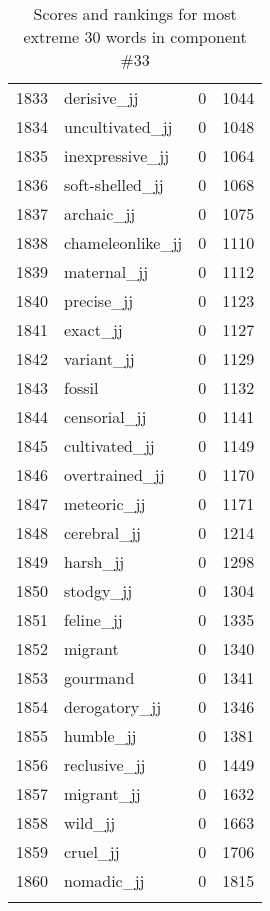 \begin{longtable}[!htbp]{| rlr@{.}l |}
    1833 & derisive\_jj & 0 & 1044 \\
    1834 & uncultivated\_jj & 0 & 1048 \\
    1835 & inexpressive\_jj & 0 & 1064 \\
    1836 & soft-shelled\_jj & 0 & 1068 \\
    1837 & archaic\_jj & 0 & 1075 \\
    1838 & chameleonlike\_jj & 0 & 1110 \\
    1839 & maternal\_jj & 0 & 1112 \\
    1840 & precise\_jj & 0 & 1123 \\
    1841 & exact\_jj & 0 & 1127 \\
    1842 & variant\_jj & 0 & 1129 \\
    1843 & fossil & 0 & 1132 \\
    1844 & censorial\_jj & 0 & 1141 \\
    1845 & cultivated\_jj & 0 & 1149 \\
    1846 & overtrained\_jj & 0 & 1170 \\
    1847 & meteoric\_jj & 0 & 1171 \\
    1848 & cerebral\_jj & 0 & 1214 \\
    1849 & harsh\_jj & 0 & 1298 \\
    1850 & stodgy\_jj & 0 & 1304 \\
    1851 & feline\_jj & 0 & 1335 \\
    1852 & migrant & 0 & 1340 \\
    1853 & gourmand & 0 & 1341 \\
    1854 & derogatory\_jj & 0 & 1346 \\
    1855 & humble\_jj & 0 & 1381 \\
    1856 & reclusive\_jj & 0 & 1449 \\
    1857 & migrant\_jj & 0 & 1632 \\
    1858 & wild\_jj & 0 & 1663 \\
    1859 & cruel\_jj & 0 & 1706 \\
    1860 & nomadic\_jj & 0 & 1815 \\
    \hline
    \caption{Scores and rankings for most extreme 30 words in component \#33} \\
\end{longtable}
